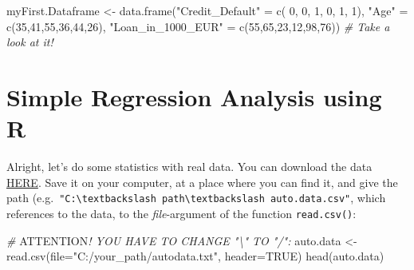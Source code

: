\documentclass[
]{book}
\newenvironment{Shaded}{\begin{snugshade}}{\end{snugshade}}
\newcommand{\AlertTok}[1]{\textcolor[rgb]{0.94,0.16,0.16}{#1}}
\newcommand{\AttributeTok}[1]{\textcolor[rgb]{0.77,0.63,0.00}{#1}}
\newcommand{\CommentTok}[1]{\textcolor[rgb]{0.56,0.35,0.01}{\textit{#1}}}
\newcommand{\ConstantTok}[1]{\textcolor[rgb]{0.00,0.00,0.00}{#1}}
\newcommand{\DecValTok}[1]{\textcolor[rgb]{0.00,0.00,0.81}{#1}}
\newcommand{\FunctionTok}[1]{\textcolor[rgb]{0.00,0.00,0.00}{#1}}
\newcommand{\NormalTok}[1]{#1}
\newcommand{\OtherTok}[1]{\textcolor[rgb]{0.56,0.35,0.01}{#1}}
\newcommand{\StringTok}[1]{\textcolor[rgb]{0.31,0.60,0.02}{#1}}
\begin{document}
\begin{Shaded}
\begin{Highlighting}[]
\NormalTok{myFirst.Dataframe }\OtherTok{\textless{}{-}} \FunctionTok{data.frame}\NormalTok{(}\StringTok{"Credit\_Default"}   \OtherTok{=} \FunctionTok{c}\NormalTok{( }\DecValTok{0}\NormalTok{, }\DecValTok{0}\NormalTok{, }\DecValTok{1}\NormalTok{, }\DecValTok{0}\NormalTok{, }\DecValTok{1}\NormalTok{, }\DecValTok{1}\NormalTok{), }
                                \StringTok{"Age"}              \OtherTok{=} \FunctionTok{c}\NormalTok{(}\DecValTok{35}\NormalTok{,}\DecValTok{41}\NormalTok{,}\DecValTok{55}\NormalTok{,}\DecValTok{36}\NormalTok{,}\DecValTok{44}\NormalTok{,}\DecValTok{26}\NormalTok{), }
                                \StringTok{"Loan\_in\_1000\_EUR"} \OtherTok{=} \FunctionTok{c}\NormalTok{(}\DecValTok{55}\NormalTok{,}\DecValTok{65}\NormalTok{,}\DecValTok{23}\NormalTok{,}\DecValTok{12}\NormalTok{,}\DecValTok{98}\NormalTok{,}\DecValTok{76}\NormalTok{)) }
\CommentTok{\# Take a look at it!}
\end{Highlighting}
\end{Shaded}

\hfill\break

\hypertarget{simple-regression-analysis-using-r}{%
\section{Simple Regression Analysis using R}\label{simple-regression-analysis-using-r}}

Alright, let's do some statistics with real data. You can download the data \href{https://github.com/lidom/Teaching_Repo}{HERE}. Save it on your computer, at a place where you can find it, and give the path (e.g.~\texttt{"C:\textbackslash{}textbackslash\ path\textbackslash{}textbackslash\ auto.data.csv"}, which references to the data, to the \emph{file}-argument of the function \texttt{read.csv()}:

\begin{Shaded}
\begin{Highlighting}[]
\CommentTok{\# }\AlertTok{ATTENTION}\CommentTok{! YOU HAVE TO CHANGE "\textbackslash{}" TO "/":}
\NormalTok{auto.data }\OtherTok{\textless{}{-}} \FunctionTok{read.csv}\NormalTok{(}\AttributeTok{file=}\StringTok{"C:/your\_path/autodata.txt"}\NormalTok{, }\AttributeTok{header=}\ConstantTok{TRUE}\NormalTok{)}
\FunctionTok{head}\NormalTok{(auto.data)}
\end{Highlighting}
\end{Shaded}
\end{document}
